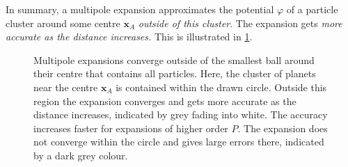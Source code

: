 \documentclass{scrbook}
\newcommand{\vv}[1]{\ensuremath{\symbf{#1}}} %
\begin{document}
In summary, a multipole expansion approximates the potential $\varphi$ of a
particle cluster around some centre $\vv{x}_A$ \emph{outside of this cluster}.
The expansion gets \emph{more accurate as the distance increases.} This is
illustrated in \cref{fig:multipole-expansion}.

\begin{figure}
\centering
{}
\caption{\label{fig:multipole-expansion}Multipole expansions converge outside
of the smallest ball around their centre that contains all particles. Here, the
cluster of planets near the centre $\vv{x}_A$ is contained within the drawn
circle. Outside this region the expansion converges and gets more accurate as
the distance increases, indicated by grey fading into white. The accuracy
increases faster for expansions of higher order $P$. The expansion does not
converge within the circle and gives large errors there, indicated by a dark
grey colour.}
\end{figure}
\end{document}
